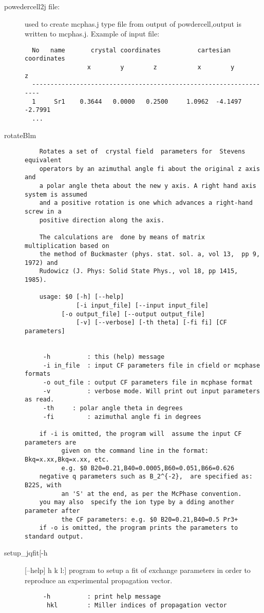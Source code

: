 \begin{description}
\item [\prg powedercell2j file:]     used to create mcphas.j type file from %
output of powdercell,output is written to mcphas.j.  Example of input file:
\begin{verbatim}
  No   name       crystal coordinates          cartesian coordinates
                 x        y        z           x        y        z
  ------------------------------------------------------------------
  1     Sr1    0.3644   0.0000   0.2500     1.0962  -4.1497  -2.7991
  ...
  \end{verbatim}
\item [\prg rotateBlm]
  \begin{verbatim}
    Rotates a set of  crystal field  parameters for  Stevens equivalent
    operators by an azimuthal angle fi about the original z axis and
    a polar angle theta about the new y axis. A right hand axis system is assumed
    and a positive rotation is one which advances a right-hand screw in a
    positive direction along the axis.

    The calculations are  done by means of matrix  multiplication based on
    the method of Buckmaster (phys. stat. sol. a, vol 13,  pp 9, 1972) and
    Rudowicz (J. Phys: Solid State Phys., vol 18, pp 1415, 1985).   

    usage: $0 [-h] [--help] 
              [-i input_file] [--input input_file]
	      [-o output_file] [--output output_file]
              [-v] [--verbose] [-th theta] [-fi fi] [CF parameters]

          
     -h          : this (help) message
     -i in_file  : input CF parameters file in cfield or mcphase formats
     -o out_file : output CF parameters file in mcphase format
     -v          : verbose mode. Will print out input parameters as read.
     -th	 : polar angle theta in degrees
     -fi         : azimuthal angle fi in degrees

    if -i is omitted, the program will  assume the input CF parameters are
          given on the command line in the format: Bkq=x.xx,Bkq=x.xx, etc.
          e.g. $0 B20=0.21,B40=0.0005,B60=0.051,B66=0.626
    negative q parameters such as B_2^{-2},  are specified as:  B22S, with 
          an 'S' at the end, as per the McPhase convention.
    you may also  specify the ion type by a dding another  parameter after
          the CF parameters: e.g. $0 B20=0.21,B40=0.5 Pr3+
    if -o is omitted, the program prints the parameters to standard output.
  \end{verbatim}
\item[\prg   setup\_jqfit[-h] [--help] h k l:] program to setup a fit of exchange parameters in order to reproduce an experimental propagation vector.
\begin{verbatim}
     -h          : print help message
      hkl        : Miller indices of propagation vector


\end{verbatim}
\end{description}
